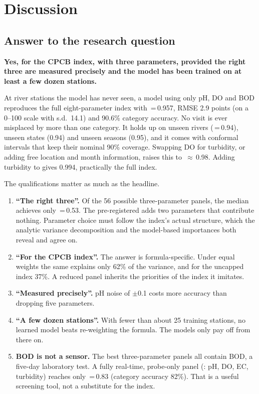 \section{Discussion}
\label{sec:discussion}

\subsection{Answer to the research question}

\begin{keybox}
\textbf{Yes, for the CPCB index, with three parameters, provided the right three are measured precisely and the model has been trained on at least a few dozen stations.}

At river stations the model has never seen, a model using only pH, DO and BOD reproduces the full eight-parameter index with \R{}\,=\,0.957, RMSE 2.9 points (on a 0--100 scale with s.d.\ 14.1) and 90.6\% category accuracy. No visit is ever misplaced by more than one category. It holds up on unseen rivers (\R{}\,=\,0.94), unseen states (0.94) and unseen seasons (0.95), and it comes with conformal intervals that keep their nominal 90\% coverage. Swapping DO for turbidity, or adding free location and month information, raises this to \R{}\,$\approx$\,0.98. Adding turbidity to  gives 0.994, practically the full index.
\end{keybox}

The qualifications matter as much as the headline.
\begin{enumerate}
  \item \textbf{``The right three''.} Of the 56 possible three-parameter panels, the median achieves only \R{}\,=\,0.53. The pre-registered  adds two parameters that contribute nothing. Parameter choice must follow the index's actual structure, which the analytic variance decomposition and the model-based importances both reveal and agree on.
  \item \textbf{``For the CPCB index''.} The answer is formula-specific. Under equal weights the same  explains only 62\% of the variance, and for the uncapped index 37\%. A reduced panel inherits the priorities of the index it imitates.
  \item \textbf{``Measured precisely''.} pH noise of $\pm$0.1 costs more accuracy than dropping five parameters.
  \item \textbf{``A few dozen stations''.} With fewer than about 25 training stations, no learned model beats re-weighting the formula. The models only pay off from there on.
  \item \textbf{BOD is not a sensor.} The best three-parameter panels all contain BOD, a five-day laboratory test. A fully real-time, probe-only panel (: pH, DO, EC, turbidity) reaches only \R{}\,=\,0.83 (category accuracy 82\%). That is a useful screening tool, not a substitute for the index.
\end{enumerate}


